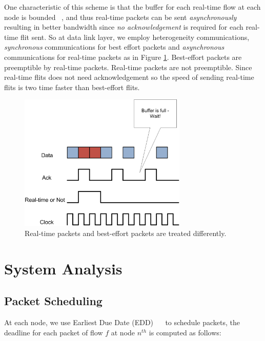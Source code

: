 \documentclass[conference, twocolumn]{IEEEtran}
\theoremstyle{definition}
\begin{document}
One characteristic of this scheme is that the buffer for each 
real-time flow at each node is bounded ~\cite{Ferrari90ascheme}, and thus
real-time packets can be sent {\em asynchronously} resulting in better bandwidth
since {\em no acknowledgement} is required for each real-time flit sent. So at
data link layer, we employ heterogeneity communications, {\em synchronous}
communications for best effort packets and {\em asynchronous} communications
for real-time packets as in Figure \ref{fig:HeteroComm}. Best-effort packets
are preemptible by real-time packets. Real-time packets are not preemptible.
Since real-time flits does not need acknowledgement so the speed of sending
real-time flits is two time faster than best-effort flits.


\begin{figure}[htbp]
\centering
\includegraphics[width=8cm]{pics/HeteroComm.png}
\caption[Heterogeneous Communication for Packets.]
{Real-time packets and best-effort packets are treated
differently.}\label{fig:HeteroComm}
\end{figure}

\section{System Analysis}
\subsection{Packet Scheduling}
At each node, we use Earliest Due Date (EDD)
~\cite{VermaJitter91}~\cite{LiuSchedulingRT} to schedule packets, the deadline
for each packet of flow $f$ at node $n^{th}$ is computed as follows:

\end{document}
